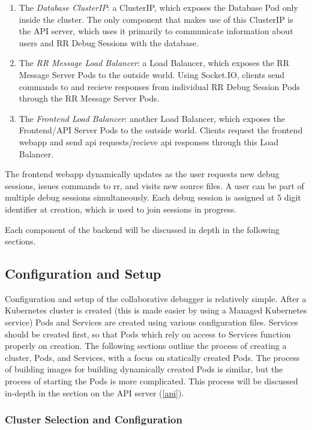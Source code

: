 \documentclass[12pt]{article}
\begin{document}
\begin{enumerate}
\item The \textit{Database ClusterIP}: a ClusterIP, which exposes the
  Database Pod only inside the cluster.  The only component that makes
  use of this ClusterIP is the API server, which uses it primarily to
  communicate information about users and RR Debug Sessions with the
  database.
\item The \textit{RR Message Load Balancer}: a Load Balancer, which
  exposes the RR Message Server Pods to the outside world.  Using
  Socket.IO, clients send commands to and recieve responses from
  individual RR Debug Session Pods through the RR Message Server Pods.
\item The \textit{Frontend Load Balancer}: another Load Balancer,
  which exposes the Frontend/API Server Pods to the outside world.
  Clients request the frontend webapp and send api requests/recieve
  api responses through this Load Balancer.
\end{enumerate}

The frontend webapp dynamically updates as the user requests new debug
sessions, issues commands to rr, and visits new source files.  A user
can be part of multiple debug sessions simultaneously.  Each debug
session is assigned at 5 digit identifier at creation, which is used
to join sessions in progress.
\par

Each component of the backend will be discussed in depth in the
following sections.

\subsection{Configuration and Setup}

Configuration and setup of the collaborative debugger is relatively
simple.  After a Kubernetes cluster is created (this is made easier by
using a Managed Kubernetes service) Pods and Services are created
using various configuration files.  Services should be created first,
so that Pods which rely on access to Services function properly on
creation.  The following sections outline the process of creating a
cluster, Pods, and Services, with a focus on statically created Pods.
The process of building images for building dynamically created Pods
is similar, but the process of starting the Pods is more complicated.
This process will be discussed in-depth in the section on the API
server (\ref{api}).

\subsubsection{Cluster Selection and Configuration}
\end{document}
